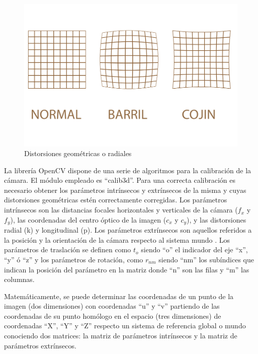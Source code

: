 \begin{figure}
\centering
\includegraphics[scale = 0.3]{capitulo_02/figuras_dir/distorsion.jpg}
\caption{Distorsiones geométricas o radiales}
\end{figure}

La librería OpenCV dispone de una serie de algoritmos para la calibración de la cámara. El módulo empleado es ``calib3d''. Para una correcta calibración es necesario obtener los parámetros intrínsecos y extrínsecos de la misma y cuyas distorsiones geométricas estén correctamente corregidas.
Los parámetros intrínsecos son las distancias focales horizontales y verticales de la cámara ($f_x$ y $f_y$), las coordenadas del centro óptico de la imagen ($c_x$ y $c_y$), y las distorsiones radial (k) y longitudinal (p). Los parámetros extrínsecos son aquellos referidos a la posición y la orientación de la cámara respecto al sistema mundo \citep{de2010deteccion}. Los parámetros de traslación se definen como $t_o$ siendo ``o'' el indicador del eje ``x'', ``y'' ó ``z'' y los parámetros de rotación, como $r_{nm}$ siendo ``nm'' los subíndices que indican la posición del parámetro en la matriz donde ``n'' son las filas y ``m'' las columnas.

Matemáticamente, se puede determinar las coordenadas de un punto de la imagen (dos dimensiones) con coordenadas ``u'' y ``v'' partiendo de las coordenadas de su punto homólogo en el espacio (tres dimensiones) de coordenadas ``X'', ``Y'' y ``Z'' respecto un sistema de referencia global o mundo conociendo dos matrices: la matriz de parámetros intrínsecos y la matriz de parámetros extrínsecos.

